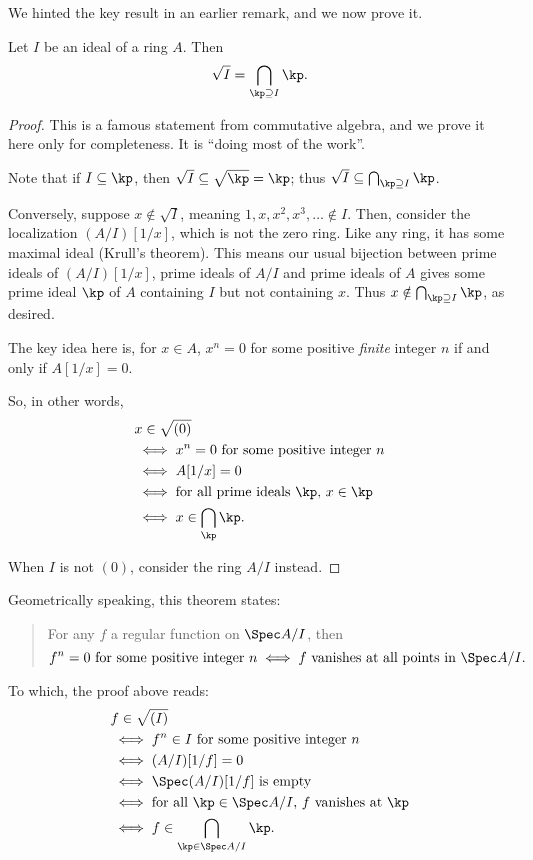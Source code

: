 We hinted the key result in an earlier remark,
and we now prove it.
\begin{theorem}
	\label{thm:radical_intersect_prime}
	Let $I$ be an ideal of a ring $A$.
	Then \[ \sqrt I = \bigcap_{\kp \supseteq I} \kp. \]
\end{theorem}
\begin{proof}
	This is a famous statement from commutative algebra,
	and we prove it here only for completeness.
	It is ``doing most of the work''.

	Note that if $I \subseteq \kp$,
	then $\sqrt I \subseteq \sqrt{\kp} = \kp$;
	thus $\sqrt I \subseteq \bigcap_{\kp \supseteq I} \kp$.

	Conversely, suppose $x \notin \sqrt I$,
	meaning $1, x, x^2, x^3, \dots \notin I$.
	Then, consider the localization $(A/I)[1/x]$, which is not the zero ring.
	Like any ring, it has some maximal ideal (Krull's theorem).
	This means our usual bijection between prime ideals of $(A/I)[1/x]$,
	prime ideals of $A/I$ and prime ideals of $A$
	gives some prime ideal $\kp$ of $A$ containing $I$ but not containing $x$.
	Thus $x \notin \bigcap_{\kp \supseteq I} \kp$,
	as desired.

	The key idea here is, for $x \in A$,
	$x^n = 0$ for some positive \emph{finite} integer $n$ if and only if $A[1/x] = 0$.

	So, in other words,
	\begin{align*}
		& x \in \sqrt{(0)} \\
		& \iff \text{$x^n = 0$ for some positive integer $n$} \\
		& \iff A[1/x] = 0 \\
		& \iff \text{for all prime ideals $\kp$, $x \in \kp$} \\
		& \iff x \in \bigcap_\kp \kp.
	\end{align*}

	When $I$ is not $(0)$, consider the ring $A/I$ instead.
\end{proof}

Geometrically speaking, this theorem states:
\begin{quote}
	For any $f$ a regular function on $\Spec A/I$, then
	\[
		\text{$f^n = 0$ for some positive integer $n$}
		\iff \text{$f$ vanishes at all points in $\Spec A/I$}.
	\]
\end{quote}
To which, the proof above reads:
\begin{align*}
	& f \in \sqrt{(I)} \\
	& \iff \text{$f^n \in I$ for some positive integer $n$} \\
	& \iff (A/I)[1/f] = 0 \\
	& \iff \text{$\Spec (A/I)[1/f]$ is empty} \\
	& \iff \text{for all $\kp \in \Spec A/I$, $f$ vanishes at $\kp$} \\
	& \iff f \in \bigcap_{\kp \in \Spec A/I} \kp.
\end{align*}

